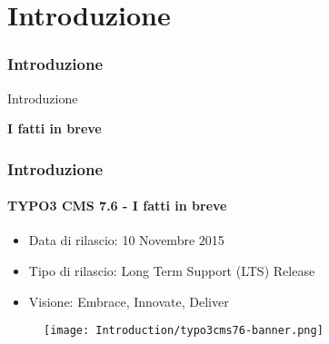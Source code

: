 %

\section{Introduzione}
\begin{frame}[fragile]
	\frametitle{Introduzione}

	\begin{center}\huge{Introduzione}\end{center}
	\begin{center}\huge{\color{typo3darkgrey}\textbf{I fatti in breve}}\end{center}

\end{frame}

\begin{frame}[fragile]
	\frametitle{Introduzione}
	\framesubtitle{TYPO3 CMS 7.6 - I fatti in breve}

	\begin{itemize}
		\item Data di rilascio: 10 Novembre 2015
		\item Tipo di rilascio:
			\begingroup\color{red}Long Term Support (LTS) Release\endgroup
		\item Visione: Embrace, Innovate, Deliver
	\end{itemize}

	\begin{figure}
		\texttt{[image: Introduction/typo3cms76-banner.png]}
	\end{figure}

\end{frame}

